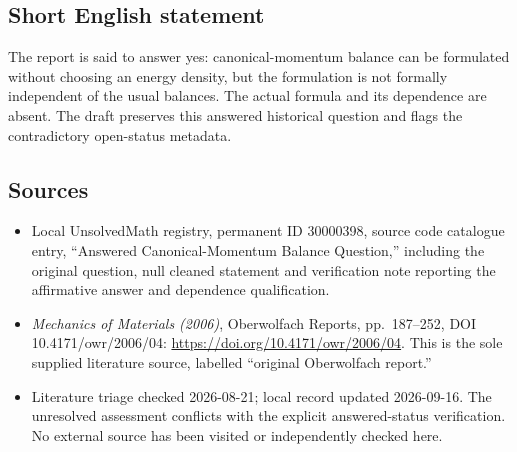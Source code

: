 \documentclass[11pt]{article}
\begin{document}
\subsection{Short English statement}
The report is said to answer yes: canonical-momentum balance can be formulated without choosing an energy density, but the formulation is not formally independent of the usual balances. The actual formula and its dependence are absent. The draft preserves this answered historical question and flags the contradictory open-status metadata.
\subsection{Sources}
\begin{itemize}
\item Local UnsolvedMath registry, permanent ID 30000398, source code catalogue entry, ``Answered Canonical-Momentum Balance Question,'' including the original question, null cleaned statement and verification note reporting the affirmative answer and dependence qualification.
\item \emph{Mechanics of Materials (2006)}, Oberwolfach Reports, pp.\ 187--252, DOI 10.4171/owr/2006/04: \url{https://doi.org/10.4171/owr/2006/04}. This is the sole supplied literature source, labelled ``original Oberwolfach report.''
\item Literature triage checked 2026-08-21; local record updated 2026-09-16. The unresolved assessment conflicts with the explicit answered-status verification. No external source has been visited or independently checked here.
\end{itemize}
\end{document}
